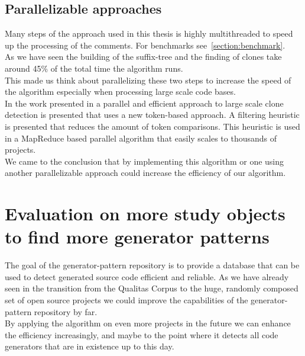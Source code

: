 \subsection{Parallelizable approaches}
Many steps of the approach used in this thesis is highly multithreaded to speed up the processing of the comments. For benchmarks see~\ref{section:benchmark}.\\
As we have seen the building of the suffix-tree and the finding of clones take around 45\% of the total time the algorithm runs. \\
This made us think about parallelizing these two steps to increase the speed of the algorithm especially when processing large scale code bases.\\
In the work presented in \cite{Sajnani2013} a parallel and efficient approach to large scale clone detection is presented that uses a new token-based approach. A filtering heuristic is presented that reduces the amount of token comparisons. This heuristic is used in a MapReduce based parallel algorithm that easily scales to thousands of projects.\\
We came to the conclusion that by implementing this algorithm or one using another parallelizable approach could increase the efficiency of our algorithm. 


\section{Evaluation on more study objects to find more generator patterns}
The goal of the generator-pattern repository is to provide a database that can be used to detect generated source code efficient and reliable. As we have already seen in the transition from the Qualitas Corpus to the huge, randomly composed set of open source projects we could improve the capabilities of the generator-pattern repository by far.\\
By applying the algorithm on even more projects in the future we can enhance the efficiency increasingly, and maybe to the point where it detects all code generators that are in existence up to this day.